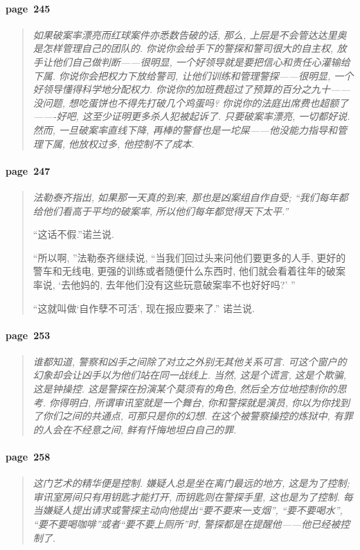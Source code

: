 \paragraph*{page~245}
\begin{quotation}
    \itshape
    如果破案率漂亮而红球案件亦悉数告破的话, 那么, 上层是不会管达达里奥是怎样管理自己的团队的. 你说你会给手下的警探和警司很大的自主权, 放手让他们自己做判断------很明显, 一个好领导就是要把信心和责任心灌输给下属. 你说你会把权力下放给警司, 让他们训练和管理警探------很明显, 一个好领导懂得科学地分配权力. 你说你的加班费超过了预算的百分之九十------没问题, 想吃蛋饼也不得先打破几个鸡蛋吗? 你说你的法庭出席费也超额了-------好吧, 这至少证明更多杀人犯被起诉了. 只要破案率漂亮, 一切都好说. 然而, 一旦破案率直线下降, 再棒的警督也是一坨屎------他没能力指导和管理下属, 他放权过多, 他控制不了成本.  
\end{quotation}

\paragraph*{page~247}
\begin{quotation}
    \itshape
    法勒泰齐指出, 如果那一天真的到来, 那也是凶案组自作自受; ``我们每年都给他们看高于平均的破案率, 所以他们每年都觉得天下太平.''

    ``这话不假.''诺兰说.

    ``所以啊, ''法勒泰齐继续说, ``当我们回过头来问他们要更多的人手, 更好的警车和无线电, 更强的训练或者随便什么东西时, 他们就会看着往年的破案率说, `去他妈的, 去年他们没有这些玩意破案率不也好好吗?' ''

    ``这就叫做`自作孽不可活', 现在报应要来了.'' 诺兰说. 
\end{quotation}

\paragraph*{page~253}
\begin{quotation}
    \itshape
    谁都知道, 警察和凶手之间除了对立之外别无其他关系可言. 可这个窗户的幻象却会让凶手以为他们站在同一战线上. 当然, 这是个谎言, 这是个欺骗, 这是钟操控. 这是警探在扮演某个莫须有的角色, 然后全方位地控制你的思考. 你得明白, 所谓审讯室就是一个舞台, 你和警探就是演员, 你以为你找到了你们之间的共通点, 可那只是你的幻想. 在这个被警察操控的炼狱中, 有罪的人会在不经意之间, 鲜有忏悔地坦白自己的罪.
\end{quotation}

\paragraph*{page~258}
\begin{quotation}
    \itshape
    这门艺术的精华便是控制. 嫌疑人总是坐在离门最远的地方, 这是为了控制; 审讯室房间只有用钥匙才能打开, 而钥匙则在警探手里, 这也是为了控制. 每当嫌疑人提出请求或警探主动向他提出``要不要来一支烟'', ``要不要喝水'', ``要不要喝咖啡''或者``要不要上厕所''时, 警探都是在提醒他------他已经被控制了. 
\end{quotation}


